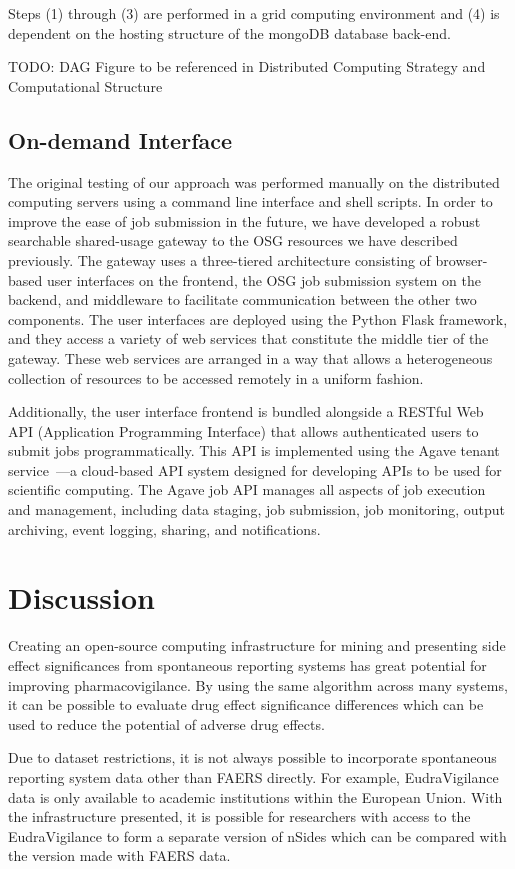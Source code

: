 \documentclass{ws-procs11x85}
\begin{document}
Steps (1) through (3) are performed in a grid computing environment
and (4) is dependent on the hosting structure of the mongoDB database
back-end.

TODO: DAG Figure to be referenced in Distributed Computing Strategy
and Computational Structure





\subsection{On-demand Interface}
The original testing of our approach was performed manually on the
distributed computing servers using a command line interface and shell
scripts. In order to improve the ease of job submission in the future,
we have developed a robust searchable shared-usage gateway to the OSG
resources we have described previously. The gateway uses a
three-tiered architecture consisting of browser-based user interfaces
on the frontend, the OSG job submission system on the backend, and
middleware to facilitate communication between the other two
components. The user interfaces are deployed using the Python Flask
framework, and they access a variety of web services that constitute
the middle tier of the gateway. These web services are arranged in a
way that allows a heterogeneous collection of resources to be accessed
remotely in a uniform fashion.

Additionally, the user interface frontend is bundled alongside a
RESTful Web API (Application Programming Interface) that allows
authenticated users to submit jobs programmatically. This API is
implemented using the Agave tenant service~\cite{dooley2012agave}---a
cloud-based API system designed for developing APIs to be used for
scientific computing. The Agave job API manages all aspects of job
execution and management, including data staging, job submission, job
monitoring, output archiving, event logging, sharing, and
notifications.

\section{Discussion}

Creating an open-source computing infrastructure for mining and
presenting side effect significances from spontaneous reporting
systems has great potential for improving pharmacovigilance. By using
the same algorithm across many systems, it can be possible to evaluate
drug effect significance differences which can be used to reduce the
potential of adverse drug effects.

Due to dataset restrictions, it is not always possible to incorporate
spontaneous reporting system data other than FAERS directly.  For
example, EudraVigilance data is only available to academic
institutions within the European Union. With the infrastructure
presented, it is possible for researchers with access to the
EudraVigilance to form a separate version of nSides which can be
compared with the version made with FAERS data.






\end{document}
